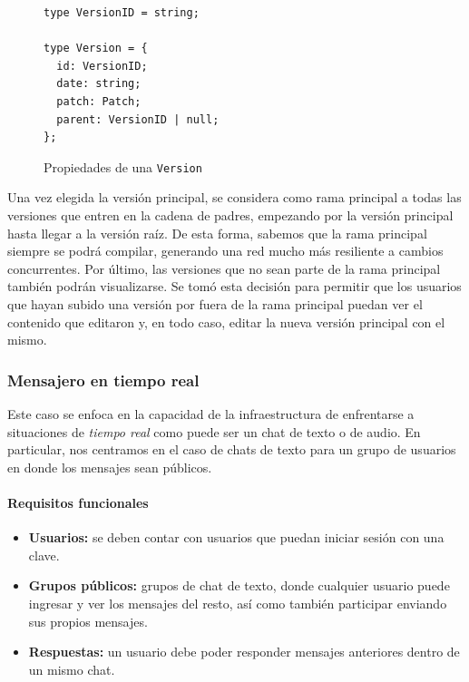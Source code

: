 \begin{figure}[H]
    \centering
    \begin{minipage}{0.9\linewidth}
        \lstset{
            basicstyle=\ttfamily\small,
            frame=single,
            captionpos=b
        }
        \begin{lstlisting}
type VersionID = string;

type Version = {
  id: VersionID;
  date: string;
  patch: Patch;
  parent: VersionID | null;
};\end{lstlisting}
    \end{minipage}
    \caption{Propiedades de una \texttt{Version}}
    \label{fig:version-type}
\end{figure}

Una vez elegida la versión principal, se considera como rama principal a todas las versiones que entren en la cadena de padres, empezando por la versión principal hasta llegar a la versión raíz. De esta forma, sabemos que la rama principal siempre se podrá compilar, generando una red mucho más resiliente a cambios concurrentes. 
Por último, las versiones que no sean parte de la rama principal también podrán visualizarse. Se tomó esta decisión para permitir que los usuarios que hayan subido una versión por fuera de la rama principal puedan ver el contenido que editaron y, en todo caso, editar la nueva versión principal con el mismo.

\subsubsection{Mensajero en tiempo real}

Este caso se enfoca en la capacidad de la infraestructura de enfrentarse a situaciones de \textit{tiempo real} como puede ser un chat de texto o de audio. En particular, nos centramos en el caso de chats de texto para un grupo de usuarios en donde los mensajes sean públicos.

\paragraph{Requisitos funcionales}

\begin{itemize}
    \item \textbf{Usuarios:} se deben contar con usuarios que puedan iniciar sesión con una clave.
    \item \textbf{Grupos públicos:} grupos de chat de texto, donde cualquier usuario puede ingresar y ver los mensajes del resto, así como también participar enviando sus propios mensajes.
    \item \textbf{Respuestas:} un usuario debe poder responder mensajes anteriores dentro de un mismo chat.
\end{itemize}

